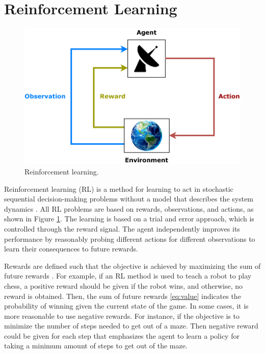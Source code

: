 \documentclass[english, 12pt, a4paper, elec, utf8, a-1b, online]{aaltothesis}
\begin{document}
\newpage
\section{Reinforcement Learning} \label{sec:RL}

\begin{figure}[b]
    \centering
    \includegraphics{figures/RL_diagram.pdf}
    \caption{Reinforcement learning.}
    \label{fig:RL_basics}
\end{figure}

Reinforcement learning (RL) is a method for learning to act in stochastic sequential decision-making problems without a model that describes the system dynamics \cite{Sutton2018}.
All RL problems are based on rewards, observations, and actions, as shown in Figure \ref{fig:RL_basics}.
The learning is based on a trial and error approach, which is controlled through the reward signal.
The agent independently improves its performance by reasonably probing different actions for different observations to learn their consequences to future rewards.

Rewards are defined such that the objective is achieved by maximizing the sum of future rewards \cite{Sutton2018}.
For example, if an RL method is used to teach a robot to play chess, a positive reward should be given if the robot wins, and otherwise, no reward is obtained.
Then, the sum of future rewards \eqref{eq:value} indicates the probability of winning given the current state of the game.
In some cases, it is more reasonable to use negative rewards.
For instance, if the objective is to minimize the number of steps needed to get out of a maze. 
Then negative reward could be given for each step that emphasizes the agent to learn a policy for taking a minimum amount of steps to get out of the maze.
\end{document}
